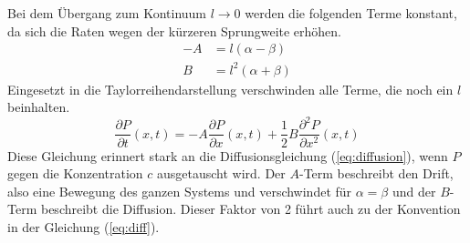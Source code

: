 Bei dem Übergang zum Kontinuum $l \to 0$ werden die folgenden Terme konstant, da sich die Raten wegen der kürzeren Sprungweite erhöhen.
\begin{align}
  - A & = l (\alpha - \beta) \\
  B & = l^2 (\alpha + \beta)
\end{align}
Eingesetzt in die Taylorreihendarstellung verschwinden alle Terme, die noch ein $l$ beinhalten.
\begin{equation}
  \frac{\partial P}{\partial t} (x, t) = - A \frac{\partial P}{\partial x}(x, t) + \frac{1}{2} B \frac{\partial^2 P}{\partial x^2} (x, t)
\end{equation}
Diese Gleichung erinnert stark an die Diffusionsgleichung (\ref{eq:diffusion}), wenn $P$ gegen die Konzentration $c$ ausgetauscht wird. Der $A$-Term beschreibt den Drift, also eine Bewegung des ganzen Systems und verschwindet für $\alpha = \beta$ und der $B$-Term beschreibt die Diffusion. Dieser Faktor von 2 führt auch zu der Konvention in der Gleichung (\ref{eq:diff}).
